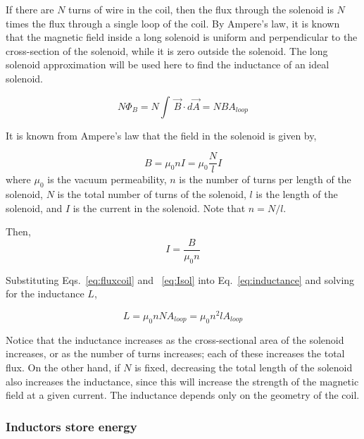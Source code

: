 \documentclass[12pt]{article}
\begin{document}
\begin{flushleft}
If there are $N$ turns of wire in the coil, then the flux through the solenoid is $N$ times the flux through a single loop of the coil.  By Ampere's law, it is known that the magnetic field inside a long solenoid is uniform and perpendicular to the cross-section of the solenoid, while it is zero outside the solenoid.  The long solenoid approximation will be used here to find the inductance of an ideal solenoid.

\begin{equation}
N\Phi_{B}=N\int \, \vec{B} \cdot d\vec{A} = NBA_{loop}
\label{eq:fluxcoil}
\end{equation}

It is known from Ampere's law that the field in the solenoid is given by,

 \begin{equation*}
 B = \mu_{0}nI = \mu_{0}\frac{N}{\mathit{l}}I
 \end{equation*}
where $\mu_{0}$ is the vacuum permeability, $n$ is the number of turns per length of the solenoid, $N$ is the total number of turns of the solenoid, $\mathit{l}$ is the length of the solenoid, and $I$ is the current in the solenoid.  Note that $n=N/\mathit{l}$.

Then,
 \begin{equation}
 I = \frac{B}{\mu_{0}n}
 \label{eq:Isol}
 \end{equation}

Substituting Eqs.~\ref{eq:fluxcoil} and ~\ref{eq:Isol} into Eq.~\ref{eq:inductance} and solving for the inductance $L$,

\begin{equation}
L=\mu_{0}nNA_{loop}=\mu_{0}n^{2}\mathit{l}A_{loop}
\label{eq:sol_inductance}
\end{equation}

Notice that the inductance increases as the cross-sectional area of the solenoid increases, or as the number of turns increases; each of these increases the total flux.  On the other hand, if $N$ is fixed, decreasing the total length of the solenoid also increases the inductance, since this will increase the strength of the magnetic field at a given current.  The inductance depends only on the geometry of the coil.

\subsubsection*{\bf Inductors store energy}


\end{flushleft}
\end{document}
